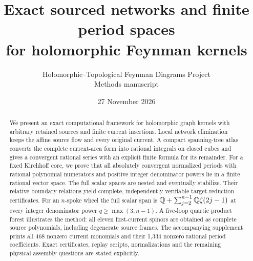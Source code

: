 \documentclass[11pt,a4paper]{article}
\title{Exact sourced networks and finite period spaces\\
for holomorphic Feynman kernels}
\author{Holomorphic--Topological Feynman Diagrams Project\\
\small Methods manuscript}
\date{27 November 2026}
\begin{document}
\maketitle
\begin{abstract}
We present an exact computational framework for holomorphic graph kernels
with arbitrary retained sources and finite current insertions. Local
network elimination keeps the affine source flow and every original
current. A compact spanning-tree atlas converts the complete current-area
form into rational integrals on closed cubes and gives a convergent
rational series with an explicit finite formula for its remainder.
For a fixed Kirchhoff core, we prove that all absolutely convergent
normalized periods with rational polynomial numerators and positive
integer denominator powers lie in a finite rational vector space.
The full scalar spaces are nested and eventually stabilize. Their
relative boundary relations yield complete, independently verifiable
target-reduction certificates. For an $n$-spoke wheel the full scalar span
is $\mathbb{Q}+\sum_{j=2}^{n-1}\mathbb{Q}\zeta(2j-1)$ at every integer denominator
power $q\ge\max(3,n-1)$. A five-loop quartic product forest illustrates
the method: all eleven first-current spinors are obtained as complete
source polynomials, including degenerate source frames. The accompanying
supplement prints all 468 nonzero current monomials and their 1,334
nonzero rational period coefficients. Exact certificates, replay scripts,
normalizations and the remaining physical assembly questions are stated
explicitly.
\end{abstract}
\tableofcontents






\clearpage
\appendix

\clearpage


\end{document}
